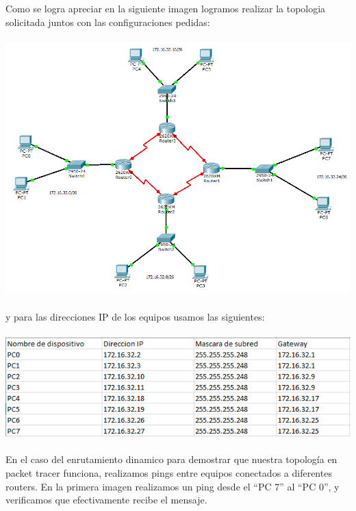 \documentclass{article}
\begin{document}
Como se logra apreciar en la siguiente imagen logramos realizar la topologia solicitada juntos con las configuraciones pedidas:\\\\

\includegraphics[scale=0.5]{topologia.png}\\\\

y para las direcciones IP de los equipos usamos las siguientes:\\\\

\includegraphics[scale=0.8]{ippc.png}\\\\

En el caso del enrutamiento dinamico para demostrar que nuestra topología en packet tracer funciona, realizamos pings entre equipos conectados a diferentes routers. En la primera imagen realizamos un ping desde el “PC 7” al “PC 0”, y verificamos que efectivamente recibe el mensaje.\\\\
\end{document}
